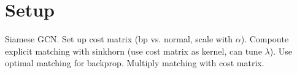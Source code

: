 \section{Setup}

Siamese GCN.
Set up cost matrix (bp vs. normal, scale with $\alpha$).
Compoute explicit matching with sinkhorn (use cost matrix as kernel, can tune $\lambda$).
Use optimal matching for backprop.
Multiply matching with cost matrix.
